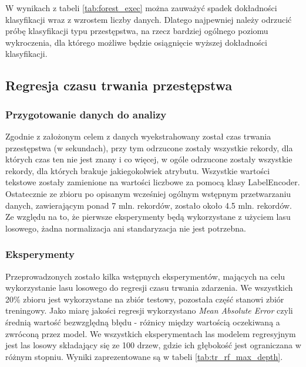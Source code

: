 \documentclass{classrep}
\begin{document}
{{{                W wynikach z tabeli \ref{tab:forest_exec} można zauważyć spadek dokładności klasyfikacji wraz z
                wzrostem liczby danych. Dlatego najpewniej należy odrzucić próbę klasyfikacji typu przestępstwa, na
                rzecz bardziej ogólnego poziomu wykroczenia, dla którego możliwe będzie osiągnięcie wyższej
                dokładności klasyfikacji.
            }
        }

        \subsection{Regresja czasu trwania przestępstwa} {
            \subsubsection{Przygotowanie danych do analizy} {
                Zgodnie z założonym celem z danych wyekstrahowany został czas trwania przestępstwa (w sekundach),
                przy tym odrzucone zostały wszystkie rekordy, dla których czas ten nie jest znany i co więcej, w
                ogóle odrzucone zostały wszystkie rekordy, dla których brakuje jakiegokolwiek atrybutu. Wszystkie
                wartości tekstowe zostały zamienione na wartości liczbowe za pomocą klasy LabelEncoder. Ostatecznie
                ze zbioru po opisanym wcześniej ogólnym wstępnym przetwarzaniu danych, zawierającym ponad 7 mln.
                rekordów, zostało około 4.5 mln. rekordów. Ze względu na to, że pierwsze eksperymenty będą
                wykorzystane z użyciem lasu losowego, żadna normalizacja ani standaryzacja nie jest potrzebna.
            }
            \subsubsection{Eksperymenty} {
                Przeprowadzonych zostało kilka wstępnych eksperymentów, mających na celu wykorzystanie lasu losowego
                do regresji czasu trwania zdarzenia. We wszystkich 20\% zbioru jest wykorzystane na zbiór testowy,
                pozostała część stanowi zbiór treningowy. Jako miarę jakości regresji wykorzystano \emph{Mean
                Absolute Error} czyli średnią wartość bezwzględną błędu - różnicy między wartością oczekiwaną a
                zwróconą przez model. We wszystkich eksperymentach las modelem regresyjnym jest las losowy składający
                się ze 100 drzew, gdzie ich głębokość jest ograniczana w różnym stopniu. Wyniki zaprezentowane są w
                tabeli \ref{tab:tr_rf_max_depth}.

}}}
\end{document}
